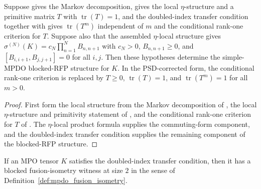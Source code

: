 \begin{theorem}
    \label{thm:simple_mpdo_blocked_rfp_data_of_sal_zcl_and_eta_local_structure}
    \leanok
    Suppose \cite[Lemma~C.2]{Cirac2016MPDO_arXiv} gives the Markov decomposition,
    \cite[Lemma~C.4]{Cirac2016MPDO_arXiv} gives the
    local $\eta$-structure and a primitive matrix $T$ with
    $\operatorname{tr}(T)=1$, and the doubled-index transfer condition together with
    \cite[Lemma~C.5]{Cirac2016MPDO_arXiv} gives
    $\operatorname{tr}(T^m)$ independent of $m$ and the conditional rank-one
    criterion for $T$. Suppose also that the assembled $\eta$-local structure gives
    $\sigma^{(N)}(K)=c_N\prod_{n=1}^N B_{n,n+1}$ with $c_N>0$,
    $B_{n,n+1}\ge 0$, and $[B_{i,i+1},B_{j,j+1}]=0$ for all $i,j$.
    Then these hypotheses determine the simple-MPDO blocked-RFP structure for $K$.
    In the PSD-corrected form, the conditional rank-one criterion is replaced
    by $T\ge0$, $\operatorname{tr}(T)=1$, and
    $\operatorname{tr}(T^m)=1$ for all $m>0$.
\end{theorem}

\begin{proof}\leanok
    First form the local structure from the Markov decomposition of
    \cite[Lemma~C.2]{Cirac2016MPDO_arXiv}, the local $\eta$-structure and
    primitivity statement of \cite[Lemma~C.4]{Cirac2016MPDO_arXiv}, and the
    conditional rank-one criterion for $T$ of
    \cite[Lemma~C.5]{Cirac2016MPDO_arXiv}. The $\eta$-local product
    formula supplies the commuting-form component, and the doubled-index
    transfer condition supplies the remaining component of the blocked-RFP
    structure.
\end{proof}

\begin{theorem}
    \label{thm:structural_implies_rfp_blocked}
    \leanok
    If an MPO tensor $K$ satisfies the doubled-index transfer condition, then
    it has a blocked fusion-isometry witness at size $2$ in the sense of
    Definition~\ref{def:mpdo_fusion_isometry}.
\end{theorem}

